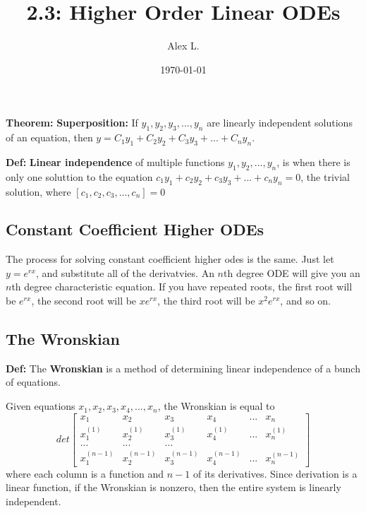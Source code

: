 \documentclass{article}
\title{2.3: Higher Order Linear ODEs}
\author{Alex L.}
\date{\today}
\begin{document}
\maketitle

\textbf{Theorem:} \textbf{Superposition:} If $y_1, y_2, y_3, ... , y_n$ are linearly independent solutions of an equation, then $y = C_1y_1 + C_2y_2 + C_3y_3 + ... + C_ny_n$.

\textbf{Def:} \textbf{Linear independence} of multiple functions $y_1, y_2, ... , y_n$, is when there is only one soluttion to the equation $c_1y_1 + c_2y_2 + c_3y_3 + ... + c_ny_n = 0$, the trivial solution, where $[c_1, c_2, c_3, ... , c_n] = 0$

\subsection{Constant Coefficient Higher ODEs}

The process for solving constant coefficient higher odes is the same. Just let $y = e^{rx}$, and substitute all of the derivatvies. An $n$th degree ODE will give you an $n$th degree characteristic equation. If you have repeated roots, the first root will be $e^{rx}$, the second root will be $xe^{rx}$, the third root will be $x^2e^{rx}$, and so on.

\subsection{The Wronskian}

\textbf{Def:} The \textbf{Wronskian} is a method of determining linear independence of a bunch of equations.

Given equations $x_1,x_2,x_3,x_4,...,x_n$, the Wronskian is equal to $$det \begin{bmatrix}
    x_1 & x_2 & x_3 & x_4 & ... & x_n \\
    x_1^{(1)} & x_2^{(1)} & x_3 ^{(1)} & x_4^{(1)} & ... & x_n^{(1)} \\
    ... & ... &...\\
    x_1^{(n-1)} & x_2^{(n-1)} & x_3^{(n-1)} & x_4^{(n-1)} & ... & x_n^{(n-1)}
\end{bmatrix}$$where each column is a function and $n-1$ of its derivatives. Since derivation is a linear function, if the Wronskian is nonzero, then the entire system is linearly independent. 
\end{document}
